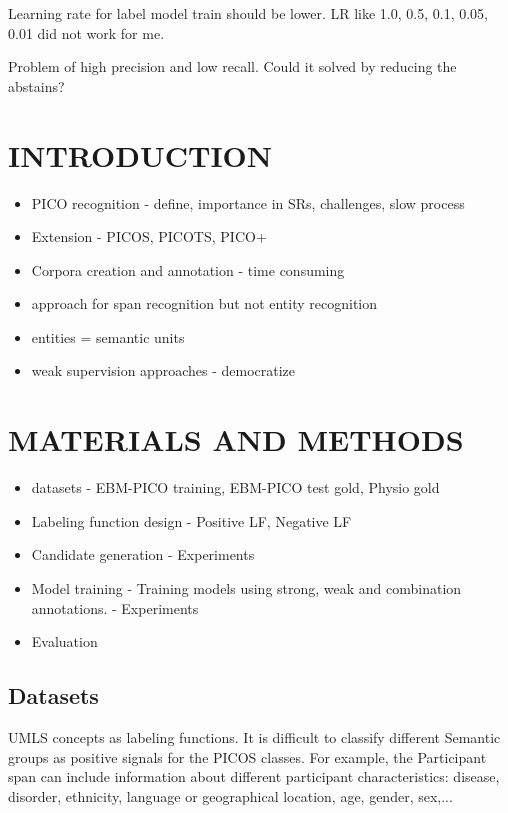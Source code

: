 \documentclass[10.7pt,]{article}
\begin{document}
Learning rate for label model train should be lower. LR like 1.0, 0.5, 0.1, 0.05, 0.01 did not work for me.

Problem of high precision and low recall. Could it solved by reducing the abstains?



%
%
%
\section{INTRODUCTION}\label{introduction}
%
\begin{itemize}
    \item PICO recognition - define, importance in SRs, challenges, slow process
    \item Extension - PICOS, PICOTS, PICO+
    \item Corpora creation and annotation - time consuming
    \item approach for span recognition but not entity recognition
    \item entities = semantic units
    \item weak supervision approaches - democratize
\end{itemize}
%
%
%
\section{MATERIALS AND METHODS}\label{methods}
%
\begin{itemize}
    \item datasets - EBM-PICO training, EBM-PICO test gold, Physio gold
    \item Labeling function design - Positive LF, Negative LF
    \item Candidate generation - Experiments
    \item Model training - Training models using strong, weak and combination annotations. - Experiments
    \item Evaluation
\end{itemize}
%
%
%
\subsection{Datasets}\label{data}
%
UMLS concepts as labeling functions. It is difficult to classify different Semantic groups as positive signals for the PICOS classes. For example, the Participant span can include information about different participant characteristics: disease, disorder, ethnicity, language or geographical location, age, gender, sex,... 
%
%
%
\end{document}
